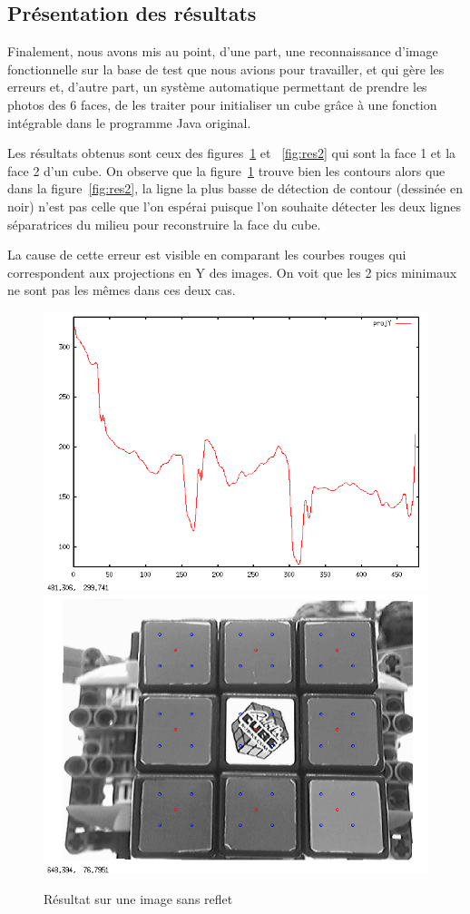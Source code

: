 \subsection{Présentation des résultats}

  Finalement, nous avons mis au point, d'une part, une reconnaissance d'image fonctionnelle sur la base de test que nous avions pour travailler, et qui gère les erreurs et, d'autre part, un système automatique permettant de prendre les photos des 6 faces, de les traiter pour initialiser un cube grâce à une fonction intégrable dans le programme Java original. 

  Les résultats obtenus sont ceux des figures~\ref{fig:res1} et ~\ref{fig:res2} qui sont la face 1 et la face 2 d'un cube. 
On observe que la figure~\ref{fig:res1} trouve bien les contours alors que dans la figure~\ref{fig:res2}, la ligne la plus basse de détection de contour (dessinée en noir) n'est pas celle que l'on espérai puisque l'on souhaite détecter les deux lignes séparatrices du milieu pour reconstruire la face du cube. 

  La cause de cette erreur est visible en comparant les courbes rouges qui correspondent aux projections en Y des images. 
On voit que les 2 pics minimaux ne sont pas les mêmes dans ces deux cas. 

  \begin{figure}[!ht]
    \centering
    \includegraphics[width=0.4\linewidth]{./Images/projY_1.png}
    \includegraphics[width=0.4\linewidth]{./Images/face_1.png}
    \caption{Résultat sur une image sans reflet}
    \label{fig:res1}
   \end{figure}

